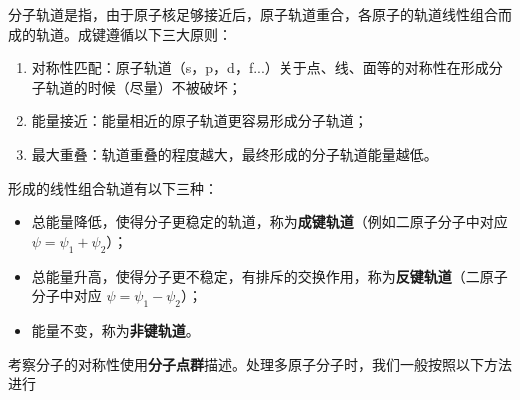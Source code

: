 
分子轨道是指，由于原子核足够接近后，原子轨道重合，各原子的轨道线性组合而成的轨道。成键遵循以下三大原则：
\begin{enumerate}
\item 对称性匹配：原子轨道（s，p，d，f...）关于点、线、面等的对称性在形成分子轨道的时候（尽量）不被破坏；
\item 能量接近：能量相近的原子轨道更容易形成分子轨道；
\item 最大重叠：轨道重叠的程度越大，最终形成的分子轨道能量越低。
\end{enumerate}

形成的线性组合轨道有以下三种：
\begin{itemize}
\item 总能量降低，使得分子更稳定的轨道，称为\textbf{成键轨道}（例如二原子分子中对应 $\psi = \psi_1 + \psi_2$）；
\item 总能量升高，使得分子更不稳定，有排斥的交换作用，称为\textbf{反键轨道}（二原子分子中对应 $\psi = \psi_1 - \psi_2$）；
\item 能量不变，称为\textbf{非键轨道}。
\end{itemize}

考察分子的对称性使用\textbf{分子点群}描述。处理多原子分子时，我们一般按照以下方法进行

